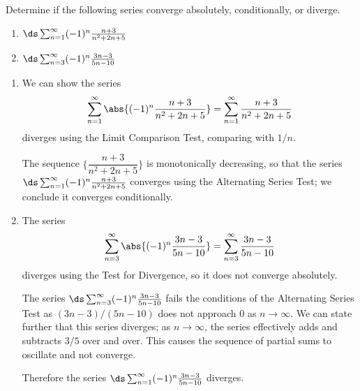 \begin{example}\label{ex_alt_series2}
Determine if the following series converge absolutely, conditionally, or diverge.\\
\begin{minipage}{.5\textwidth}
 \begin{enumerate}
  \item $\ds\sum_{n=1}^\infty (-1)^n\frac{n+3}{n^2+2n+5}$
 \end{enumerate}
\end{minipage}%
\begin{minipage}{.5\textwidth}
 \begin{enumerate}\setcounter{enumi}{1}
  \item $\ds\sum_{n=3}^\infty (-1)^n\frac{3n-3}{5n-10}$
 \end{enumerate}
\end{minipage}
\solution
\begin{enumerate}
	\item We can show the series
	\[\sum_{n=1}^\infty \abs{(-1)^n\frac{n+3}{n^2+2n+5}}= \sum_{n=1}^\infty \frac{n+3}{n^2+2n+5}\]
	diverges using the Limit Comparison Test, comparing with $1/n$. 
	
	The sequence $\{\dfrac{n+3}{n^2+2n+5}\}$ is monotonically decreasing, so that the series $\ds \sum_{n=1}^\infty (-1)^n\frac{n+3}{n^2+2n+5}$ converges using the Alternating Series Test; we conclude it converges conditionally.
	
%	
	
	\item	The series
	\[\sum_{n=3}^\infty \abs{(-1)^n\frac{3n-3}{5n-10}} = \sum_{n=3}^\infty \frac{3n-3}{5n-10}\]
	diverges using the Test for Divergence, so it does not converge absolutely. 
	
	The series $\ds \sum_{n=3}^\infty (-1)^n\frac{3n-3}{5n-10}$ fails the conditions of the Alternating Series Test as $(3n-3)/(5n-10)$ does not approach $0$ as $n\to\infty$. We can state further that this series diverges; as $n\to\infty$, the series effectively adds and subtracts $3/5$ over and over. This causes the sequence of partial sums to oscillate and not converge.
	
	Therefore the series $\ds \sum_{n=1}^\infty (-1)^n\frac{3n-3}{5n-10}$ diverges.
\end{enumerate}
\end{example}

